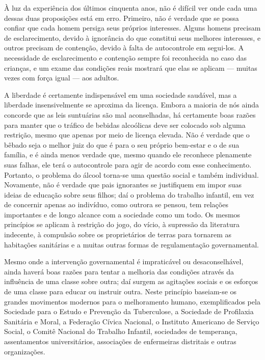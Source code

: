 \documentclass[12pt]{article}
\begin{document}
À luz da experiência dos últimos cinquenta anos, não é difícil ver onde cada uma dessas duas proposições está em erro. Primeiro, não é verdade que se possa confiar que cada homem persiga seus próprios interesses. Alguns homens precisam de esclarecimento, devido à ignorância do que constitui seus melhores interesses, e outros precisam de contenção, devido à falta de autocontrole em segui-los. A necessidade de esclarecimento e contenção sempre foi reconhecida no caso das crianças, e um exame das condições reais mostrará que elas se aplicam — muitas vezes com força igual — aos adultos.

A liberdade é certamente indispensável em uma sociedade saudável, mas a liberdade insensivelmente se aproxima da licença. Embora a maioria de nós ainda concorde que as leis suntuárias são mal aconselhadas, há certamente boas razões para manter que o tráfico de bebidas alcoólicas deve ser colocado sob alguma restrição, mesmo que apenas por meio de licença elevada. Não é verdade que o bêbado seja o melhor juiz do que é para o seu próprio bem-estar e o de sua família, e é ainda menos verdade que, mesmo quando ele reconhece plenamente suas falhas, ele terá o autocontrole para agir de acordo com esse conhecimento. Portanto, o problema do álcool torna-se uma questão social e também individual. Novamente, não é verdade que pais ignorantes se justifiquem em impor suas ideias de educação sobre seus filhos; daí o problema do trabalho infantil, em vez de concernir apenas ao indivíduo, como outrora se pensou, tem relações importantes e de longo alcance com a sociedade como um todo. Os mesmos princípios se aplicam à restrição do jogo, do vício, à supressão da literatura indecente, à compulsão sobre os proprietários de terras para tornarem as habitações sanitárias e a muitas outras formas de regulamentação governamental.

Mesmo onde a intervenção governamental é impraticável ou desaconselhável, ainda haverá boas razões para tentar a melhoria das condições através da influência de uma classe sobre outra; daí surgem as agitações sociais e os esforços de uma classe para educar ou instruir outra. Neste princípio baseiam-se os grandes movimentos modernos para o melhoramento humano, exemplificados pela Sociedade para o Estudo e Prevenção da Tuberculose, a Sociedade de Profilaxia Sanitária e Moral, a Federação Cívica Nacional, o Instituto Americano de Serviço Social, o Comitê Nacional do Trabalho Infantil, sociedades de temperança, assentamentos universitários, associações de enfermeiras distritais e outras organizações.
\end{document}
